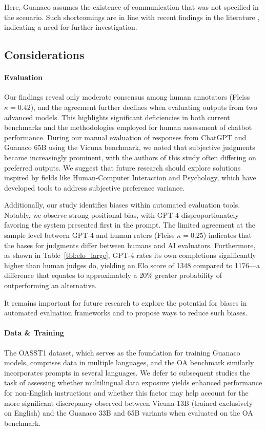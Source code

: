 Here, {Guanaco} assumes the existence of communication that was not specified in the scenario. Such shortcomings are in line with recent findings in the literature \cite{sap2022neural}, indicating a need for further investigation.

\subsection{Considerations}
\label{ssec:considerations}

\paragraph{Evaluation}

Our findings reveal only moderate consensus among human annotators (Fleiss $\kappa=0.42$), and the agreement further declines when evaluating outputs from two advanced models. This highlights significant deficiencies in both current benchmarks and the methodologies employed for human assessment of chatbot performance. During our manual evaluation of responses from ChatGPT and {Guanaco} 65B using the Vicuna benchmark, we noted that subjective judgments became increasingly prominent, with the authors of this study often differing on preferred outputs. We suggest that future research should explore solutions inspired by fields like Human-Computer Interaction and Psychology, which have developed tools to address subjective preference variance.

Additionally, our study identifies biases within automated evaluation tools. Notably, we observe strong positional bias, with GPT-4 disproportionately favoring the system presented first in the prompt. The limited agreement at the sample level between GPT-4 and human raters (Fleiss $\kappa=0.25$) indicates that the bases for judgments differ between humans and AI evaluators. Furthermore, as shown in Table~\ref{tbl:elo_large}, GPT-4 rates its own completions significantly higher than human judges do, yielding an Elo score of 1348 compared to 1176—a difference that equates to approximately a 20\% greater probability of outperforming an alternative.

It remains important for future research to explore the potential for biases in automated evaluation frameworks and to propose ways to reduce such biases.

\paragraph{Data \& Training} The OASST1 dataset, which serves as the foundation for training {Guanaco} models, comprises data in multiple languages, and the OA benchmark similarly incorporates prompts in several languages. We defer to subsequent studies the task of assessing whether multilingual data exposure yields enhanced performance for non-English instructions and whether this factor may help account for the more significant discrepancy observed between Vicuna-13B (trained exclusively on English) and the {Guanaco} 33B and 65B variants when evaluated on the OA benchmark.

